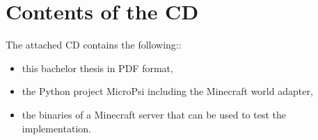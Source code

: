 \documentclass{thesisPST}
\begin{document}
\listoftables
{}
{} %

\chapter{Contents of the CD}
The attached CD contains the following::
\begin{itemize}
	\item this bachelor thesis in PDF format,
	\item the Python project MicroPsi including the Minecraft world adapter,
	\item the binaries of a Minecraft server that can be used to test the implementation.
\end{itemize}

\cleardoublepage
{}
{} %

\end{document}
